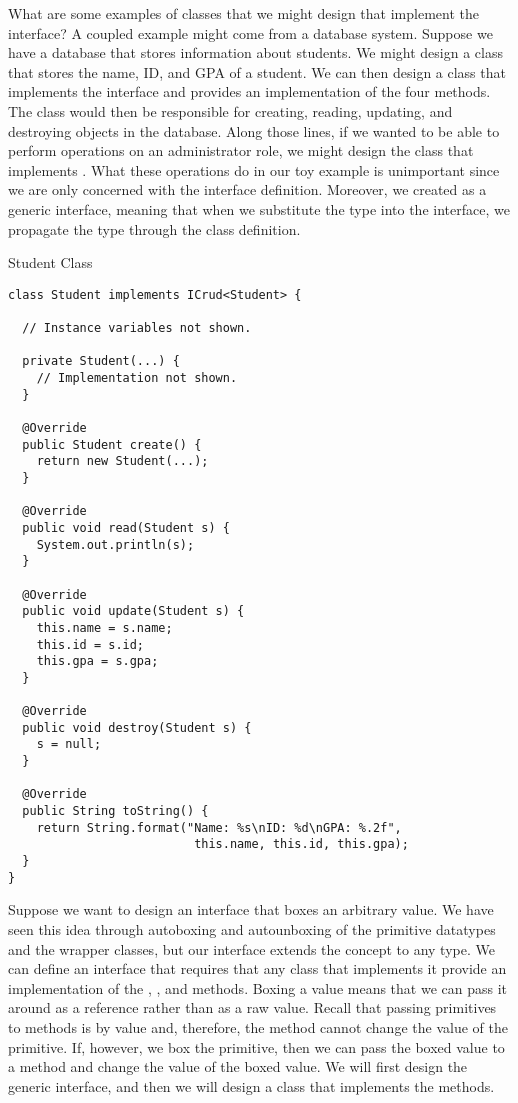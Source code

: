What are some examples of classes that we might design that implement the  interface? A coupled example might come from a database system. Suppose we have a database that stores information about students. We might design a  class that stores the name, ID, and GPA of a student. We can then design a  class that implements the  interface and provides an implementation of the four methods. The  class would then be responsible for creating, reading, updating, and destroying  objects in the database. Along those lines, if we wanted to be able to perform operations on an administrator role, we might design the  class that implements . What these operations do in our toy example is unimportant since we are only concerned with the interface definition. Moreover, we created  as a generic interface, meaning that when we substitute the type into the interface, we propagate the type through the class definition.

\begin{cl}{Student Class}
\begin{lstlisting}[language=MyJava]
class Student implements ICrud<Student> {
  
  // Instance variables not shown.
  
  private Student(...) {
    // Implementation not shown.
  }
  
  @Override
  public Student create() {
    return new Student(...);
  }
  
  @Override
  public void read(Student s) {
    System.out.println(s);
  }
  
  @Override
  public void update(Student s) {
    this.name = s.name;
    this.id = s.id;
    this.gpa = s.gpa;
  }
  
  @Override
  public void destroy(Student s) {
    s = null;
  }
  
  @Override
  public String toString() {
    return String.format("Name: %s\nID: %d\nGPA: %.2f", 
                          this.name, this.id, this.gpa);
  }
}
\end{lstlisting}
\end{cl}

\example Suppose we want to design an interface that boxes an arbitrary value. We have seen this idea through autoboxing and autounboxing of the primitive datatypes and the wrapper classes, but our interface extends the concept to any type. We can define an interface that requires that any class that implements it provide an implementation of the , , and  methods. Boxing a value means that we can pass it around as a reference rather than as a raw value. Recall that passing primitives to methods is by value and, therefore, the method cannot change the value of the primitive. If, however, we box the primitive, then we can pass the boxed value to a method and change the value of the boxed value. We will first design the generic  interface, and then we will design a class that implements the methods. 

